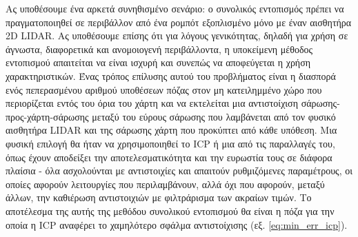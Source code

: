 Ας υποθέσουμε ένα αρκετά συνηθισμένο σενάριο: ο συνολικός εντοπισμός πρέπει να πραγματοποιηθεί σε
περιβάλλον από ένα ρομπότ εξοπλισμένο μόνο με έναν αισθητήρα 2D LIDAR. Ας υποθέσουμε επίσης
ότι για λόγους γενικότητας, δηλαδή για χρήση σε άγνωστα, διαφορετικά και ανομοιογενή
περιβάλλοντα, η υποκείμενη μέθοδος εντοπισμού απαιτείται να είναι ισχυρή και
συνεπώς να αποφεύγεται η χρήση χαρακτηριστικών. Ένας τρόπος επίλυσης αυτού του προβλήματος είναι η διασπορά ενός
πεπερασμένου αριθμού υποθέσεων πόζας στον μη κατειλημμένο χώρο που περιορίζεται εντός του
όρια του χάρτη και να εκτελείται μια αντιστοίχιση σάρωσης-προς-χάρτη-σάρωσης μεταξύ του εύρους
σάρωσης που λαμβάνεται από τον φυσικό αισθητήρα LIDAR και της σάρωσης χάρτη που προκύπτει από κάθε
υπόθεση. Μια φυσική επιλογή θα ήταν να χρησιμοποιηθεί το ICP ή μια από τις παραλλαγές του, όπως
έχουν αποδείξει την αποτελεσματικότητα και την ευρωστία τους σε διάφορα πλαίσια
\cite{paid_original}\cite{plicp}\cite{ICP}- όλα ασχολούνται με αντιστοιχίες και
απαιτούν ρυθμιζόμενες παραμέτρους, οι οποίες αφορούν λειτουργίες που περιλαμβάνουν, αλλά όχι
που αφορούν, μεταξύ άλλων, την καθιέρωση αντιστοιχιών με φιλτράρισμα των ακραίων τιμών. Το αποτέλεσμα της
αυτής της μεθόδου συνολικού εντοπισμού θα είναι η πόζα για την οποία η ICP αναφέρει
το χαμηλότερο σφάλμα αντιστοίχισης (εξ. \ref{eq:min_err_icp}).




